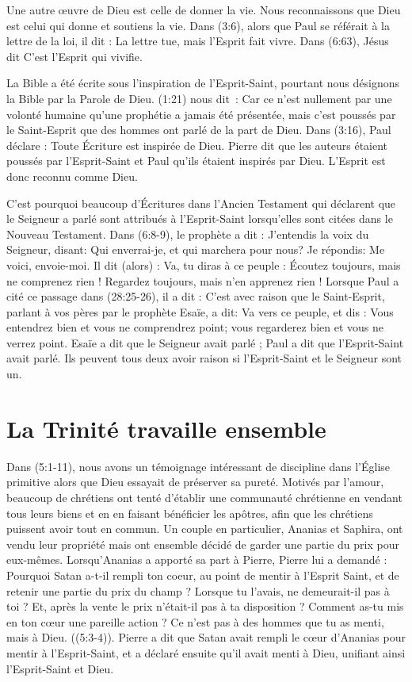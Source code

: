 Une autre œuvre de Dieu est celle de donner la vie. Nous reconnaissons que Dieu est celui qui donne et soutiens la vie. Dans (3:6), alors que Paul se référait à la lettre de la loi, il dit : \og La lettre tue, mais l'Esprit fait vivre. \fg{} Dans (6:63), Jésus dit \og C'est l'Esprit qui vivifie.\fg{}

La Bible a été écrite sous l'inspiration de l'Esprit-Saint, pourtant nous désignons la Bible par la Parole de Dieu. (1:21) nous dit~: \og Car ce n'est nullement par une volonté humaine qu'une prophétie a jamais été présentée, mais c'est poussés par le Saint-Esprit que des hommes ont parlé de la part de Dieu. \fg{} Dans (3:16), Paul déclare : \og Toute Écriture est inspirée de Dieu. \fg{} Pierre dit que les auteurs étaient poussés par l'Esprit-Saint et Paul qu'ils étaient inspirés par Dieu. L'Esprit est donc reconnu comme Dieu.

C'est pourquoi beaucoup d'Écritures dans l'Ancien Testament qui déclarent que le Seigneur a parlé sont attribués à l'Esprit-Saint lorsqu'elles sont citées dans le Nouveau Testament. Dans (6:8-9), le prophète a dit : \og J'entendis la voix du Seigneur, disant: Qui enverrai-je, et qui marchera pour nous? Je répondis: Me voici, envoie-moi. Il dit (alors) : Va, tu diras à ce peuple : Écoutez toujours, mais ne comprenez rien ! Regardez toujours, mais n'en apprenez rien ! \fg{} Lorsque Paul a cité ce passage dans (28:25-26), il a dit : \og C'est avec raison que le Saint-Esprit, parlant à vos pères par le prophète Esaïe, a dit: Va vers ce peuple, et dis : Vous entendrez bien et vous ne comprendrez point; vous regarderez bien et vous ne verrez point. \fg{} Esaïe a dit que le Seigneur avait parlé ; Paul a dit que l'Esprit-Saint avait parlé. Ils peuvent tous deux avoir raison si l'Esprit-Saint et le Seigneur sont un.


\section{La Trinité travaille ensemble}

Dans (5:1-11), nous avons un témoignage intéressant de discipline dans l'Église primitive alors que Dieu essayait de préserver sa pureté. Motivés par l'amour, beaucoup de chrétiens ont tenté d'établir une communauté chrétienne en vendant tous leurs biens et en en faisant bénéficier les apôtres, afin que les chrétiens puissent avoir tout en commun. Un couple en particulier, Ananias et Saphira, ont vendu leur propriété mais ont ensemble décidé de garder une partie du prix pour eux-mêmes. Lorsqu'Ananias a apporté sa part à Pierre, Pierre lui a demandé : \og Pourquoi Satan a-t-il rempli ton coeur, au point de mentir à l'Esprit Saint, et de retenir une partie du prix du champ ? Lorsque tu l'avais, ne demeurait-il pas à toi ? Et, après la vente le prix n'était-il pas à ta disposition ? Comment as-tu mis en ton cœur une pareille action ? Ce n'est pas à des hommes que tu as menti, mais à Dieu.  \fg{} ((5:3-4)). Pierre a dit que Satan avait rempli le cœur d'Ananias pour mentir à l'Esprit-Saint, et a déclaré ensuite qu'il avait menti à Dieu, unifiant ainsi l'Esprit-Saint et Dieu.

